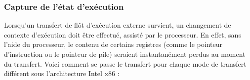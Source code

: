 			\subsubsection{Capture de l'état d'exécution}



Lorsqu'un transfert de flôt d'exécution externe survient, un changement de contexte d'exécution doit être effectué, assisté par le processeur. En effet, sans l'aide du processeur, le contenu de certains registres (comme le pointeur d'instruction ou le pointeur de pile) seraient instantanément perdus au moment du transfert. Voici comment se passe le transfert pour chaque mode de transfert différent sous l'architecture Intel x86 : 


